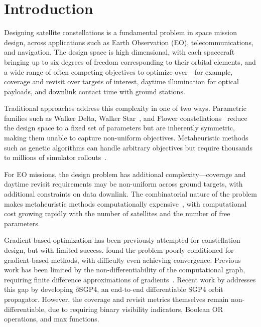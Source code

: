\section{Introduction}
\label{sec:introduction}

Designing satellite constellations is a fundamental problem in space mission design, across applications such as Earth Observation (EO), telecommunications, and navigation. The design space is high dimensional, with each spacecraft bringing up to six degrees of freedom corresponding to their orbital elements, and a wide range of often competing objectives to optimize over---for example, coverage and revisit over targets of interest, daytime illumination for optical payloads, and downlink contact time with ground stations.

Traditional approaches address this complexity in one of two ways.
Parametric families such as Walker Delta, Walker Star~\citep{walker_satellite_1984}, and Flower constellations~\citep{mortari_flower_2004} reduce the design space to a fixed set of parameters but are inherently symmetric, making them unable to capture non-uniform objectives.
Metaheuristic methods such as genetic algorithms can handle arbitrary objectives but require thousands to millions of simulator rollouts~\citep{paek_optimization_2019}.

For EO missions, the design problem has additional complexity---coverage and daytime revisit requirements may be non-uniform across ground targets, with additional constraints on data downlink. The combinatorial nature of the problem makes metaheuristic methods computationally expensive~\citep{paek_optimization_2019}, with computational cost growing rapidly with the number of satellites and the number of free parameters.

Gradient-based optimization has been previously attempted for constellation design, but with limited success. \citet{paek_optimization_2019} found the problem poorly conditioned for gradient-based methods, with difficulty even achieving convergence. Previous work has been limited by the non-differentiability of the computational graph, requiring finite difference approximations of gradients~\citep{paek_optimization_2019}. Recent work by \citet{acciarini_closing_2025} addresses this gap by developing $\partial$SGP4, an end-to-end differentiable SGP4 orbit propagator. However, the coverage and revisit metrics themselves remain non-differentiable, due to requiring binary visibility indicators, Boolean OR operations, and max functions.

